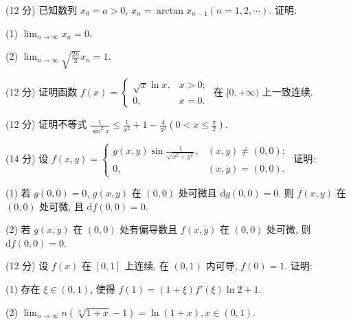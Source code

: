(12 分) 已知数列 $x_0 = a > 0$, $x_n = \arctan x_{n-1} (n = 1, 2, \cdots)$. 证明:\par
(1) $\lim_{n\to \infty}x_n = 0.$\par
(2) $\lim_{n\to \infty}\sqrt{\frac{2n}{3}} x_n = 1.$\par
(12 分) 证明函数 $f(x) = \begin{cases} \sqrt{x} \ln x, & x > 0; \\ 0, & x = 0. \end{cases}$ 在 $[0, +\infty)$ 上一致连续.\par
(12 分) 证明不等式 $\frac{1}{\sin^2 x} \leq \frac{1}{x^2} + 1 - \frac{4}{\pi^2} \left(0 < x \leq \frac{\pi}{2}\right)$.\par
(14 分) 设 $f(x, y) = \begin{cases} g(x, y) \sin \frac{1}{\sqrt{x^2 + y^2}}, & (x, y) \neq (0, 0); \\ 0, & (x, y) = (0, 0). \end{cases}$ 证明:\par
(1) 若 $g(0,0) = 0$, $g(x,y)$ 在 $(0,0)$ 处可微且 $\mathrm{d}g(0,0) = 0$. 则 $f(x,y)$ 在 $(0,0)$ 处可微, 且 $\mathrm{d}f(0,0) = 0$.\par
(2) 若 $g(x, y)$ 在 $(0, 0)$ 处有偏导数且 $f(x, y)$ 在 $(0, 0)$ 处可微, 则 $\mathrm{d}f(0, 0) = 0$.\par
(12 分) 设 $f(x)$ 在 $[0,1]$ 上连续, 在 $(0,1)$ 内可导, $f(0) = 1$. 证明:\par
(1) 存在 $\xi \in (0,1)$, 使得 $f(1) = (1 + \xi)f'(\xi)\ln 2 + 1$.\par
(2) $\lim_{n\to \infty}n(\sqrt[n]{1 + x} -1) = \ln (1 + x),x\in (0,1).$\par
\par{}
